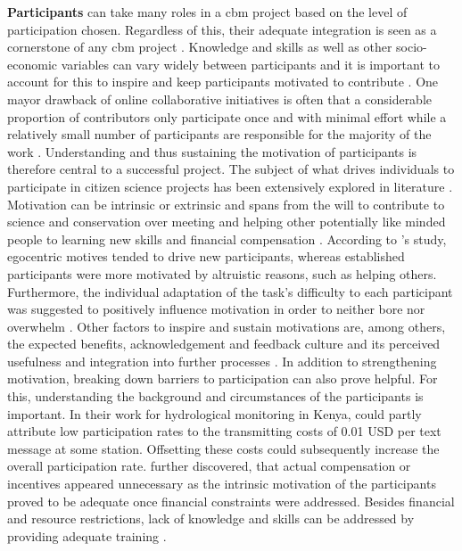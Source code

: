 \textbf{Participants} can take many roles in a \acrshort{cbm} project based on the level of participation chosen. Regardless of this, their adequate integration is seen as a cornerstone of any \acrshort{cbm} project \autocite{land-zandstraParticipantsCitizenScience2021}. Knowledge and skills as well as other socio-economic variables can vary widely between participants and it is important to account for this to inspire and keep participants motivated to contribute \autocite{minkmanCitizenScienceWater2015,whitelawEstablishingCanadianCommunity2003}. One mayor drawback of online collaborative initiatives is often that a considerable proportion of contributors only participate once and with minimal effort while a relatively small number of participants are responsible for the majority of the work \autocite{sauermannCrowdScienceUser2015}. Understanding and thus sustaining the motivation of participants is therefore central to a successful project. The subject of what drives individuals to participate in citizen science projects has been extensively explored in literature \autocite{land-zandstraParticipantsCitizenScience2021,minkmanCitizenScienceWater2015,mloza-bandaCrowdsensingSuccessfulWater2018,ruttenHowGetKeep2017,tipaldoCitizenScienceCommunitybased2017,walkerBenefitsNegativeImpacts2021}. Motivation can be intrinsic or extrinsic and spans from the will to contribute to science and conservation over meeting and helping other potentially like minded people to learning new skills and financial compensation \autocite{minkmanCitizenScienceWater2015,rotmanDynamicChangesMotivation2012,ruttenHowGetKeep2017}. According to \textcite{rotmanDynamicChangesMotivation2012}'s study, egocentric motives tended to drive new participants, whereas established participants were more motivated by altruistic reasons, such as helping others. Furthermore, the individual adaptation of the task's difficulty to each participant was suggested to positively influence motivation in order to neither bore nor overwhelm \autocite{minkmanCitizenScienceWater2015}. Other factors to inspire and sustain motivations are, among others, the expected benefits, acknowledgement and feedback culture and its perceived usefulness and integration into further processes \autocite{land-zandstraParticipantsCitizenScience2021,minkmanCitizenScienceWater2015,pettiboneCitizenScienceAll2016}. In addition to strengthening motivation, breaking down barriers to participation can also prove helpful. For this, understanding the background and circumstances of the participants is important. In their work for hydrological monitoring in Kenya, \textcite{weeserCitizenSciencePioneers2018a} could partly attribute low participation rates to the transmitting costs of 0.01 USD per text message at some station. Offsetting these costs could subsequently increase the overall participation rate. \Textcite{weeserCitizenSciencePioneers2018a} further discovered, that actual compensation or incentives appeared unnecessary as the intrinsic motivation of the participants proved to be adequate once financial constraints were addressed. Besides financial and resource restrictions, lack of knowledge and skills can be addressed by providing adequate training \autocite{fraislCitizenScienceEnvironmental2022,lackstromBackyardHydroclimatologyCitizen2022}.

